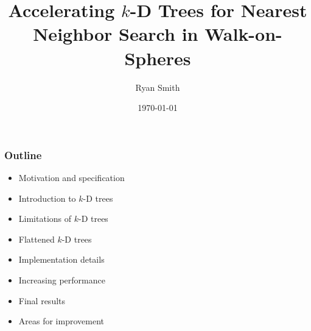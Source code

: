 \documentclass[lualatex,aspectratio=169]{beamer}
\title{Accelerating $k$-D Trees for Nearest Neighbor Search in Walk-on-Spheres}
\date[\today]{\today}
\author[Ryan Smith]{Ryan Smith}
\newcommand{\kd}{$k$-D\xspace}
\begin{document}
\begin{frame}
  \titlepage
\end{frame}

\begin{frame} 

  \frametitle{Outline} 

  \begin{itemize} 
    \item Motivation and specification
    \item Introduction to \kd trees
    \item Limitations of \kd trees
    \item Flattened \kd trees
    \item Implementation details
    \item Increasing performance
    \item Final results
    \item Areas for improvement
  \end{itemize}

\end{frame}






\end{document}

